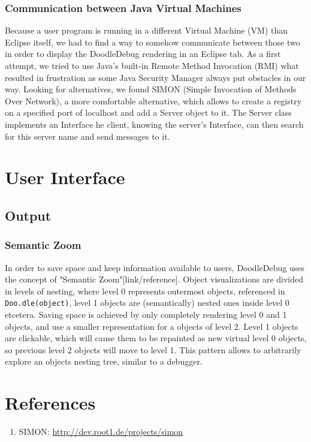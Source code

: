 \documentclass{report}
\begin{document}
\subsection*{Communication between Java Virtual Machines}
Because a user program is running in a different Virtual Machine (VM) than Eclipse itself, we had to find a way to somehow communicate between those two in order to display the DoodleDebug rendering in an Eclipse tab. As a first attempt, we tried to use Java's built-in Remote Method Invocation (RMI) what resulted in frustration as some Java Security Manager always put obstacles in our way. Looking for alternatives, we found SIMON (Simple Invocation of Methods Over Network), a more comfortable alternative, which allows to create a registry on a specified port of localhost and add a Server object to it. The Server class implements an Interface he client, knowing the server's Interface, can then search for this server name and send messages to it.

\chapter*{User Interface}
\section*{Output}
\subsection*{Semantic Zoom}
In order to save space and keep information available to users, DoodleDebug uses the concept of "Semantic Zoom"[link/reference]. Object visualizations are divided in levels of nesting, where level 0 represents outermost objects, referenced in \verb-Doo.dle(object)-, level 1 objects are (semantically) nested ones inside level 0 etcetera. Saving space is achieved by only completely rendering level 0 and 1 objects, and use a smaller representation for a objects of level 2. Level 1 objects are clickable, which will cause them to be repainted as new virtual level 0 objects, so previous level 2 objects will move to level 1. This pattern allows to arbitrarily explore an objects nesting tree, similar to a debugger.

\chapter*{References}
\begin{enumerate}
\item
SIMON: \url{http://dev.root1.de/projects/simon}
\end{enumerate}
\end{document}
